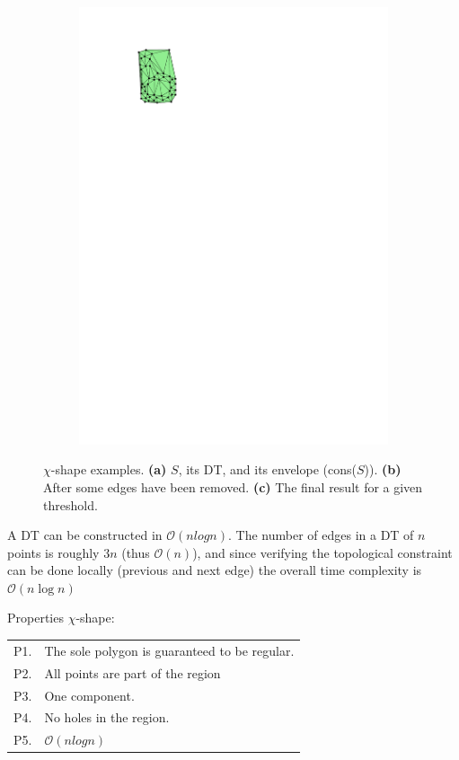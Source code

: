 \begin{figure}
\begin{subfigure}[b]{0.25\linewidth}
    \includegraphics[page=3,width=\textwidth]{figs/chishape.pdf}
    \caption{}
    \label{fig:chishape:c}
  \end{subfigure}
\caption{$\chi$-shape examples. \textbf{(a)} $S$, its DT, and its envelope (cons($S$)). \textbf{(b)} After some edges have been removed. \textbf{(c)} The final result for a given threshold.}
\label{fig:chishape}
\end{figure}

%

A DT can be constructed in $\mathcal{O}(n log n)$.
The number of edges in a DT of $n$ points is roughly $3n$ (thus $\mathcal{O}(n)$), and since verifying the topological constraint can be done locally (previous and next edge) the overall time complexity is $\mathcal{O}(n \log n)$

Properties $\chi$-shape:
\\
\begin{tabular}{@{}ll@{}}
\toprule
  P1. & The sole polygon is guaranteed to be regular.  \\  
  P2. & All points are part of the region \\ 
  P3. & One component.  \\ 
  P4. & No holes in the region.  \\  
  P5. & $\mathcal{O}(n log n)$  \\  
\bottomrule
\end{tabular}


